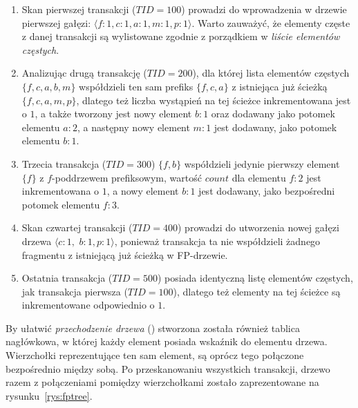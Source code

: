 \begin{enumerate}
	\item Skan pierwszej transakcji ($TID = 100$) prowadzi do wprowadzenia w drzewie pierwszej gałęzi: $\langle f: 1, c: 1, a: 1, m: 1, p: 1\rangle$. Warto zauważyć, że elementy częste z danej transakcji są wylistowane zgodnie z porządkiem w \emph{liście elementów częstych}.
	\item Analizując drugą transakcję ($TID = 200$), dla której lista elementów częstych $\lbrace f, c, a, b, m \rbrace$ współdzieli ten sam prefiks $\lbrace f, c, a \rbrace$ z istniejąca już ścieżką $\lbrace f, c, a, m, p \rbrace$, dlatego też liczba wystąpień na tej ścieżce inkrementowana jest o $1$, a także tworzony jest nowy element $b: 1$ oraz dodawany jako potomek elementu $a: 2$, a następny nowy element $m: 1$ jest dodawany, jako potomek elementu $b: 1$.
	\item Trzecia transakcja ($TID = 300$) $\lbrace f, b \rbrace$ współdzieli jedynie pierwszy element $\lbrace f \rbrace$ z $f$-poddrzewem prefiksowym, wartość $count$ dla elementu $f: 2$ jest inkrementowana o $1$, a nowy element $b: 1$ jest dodawany, jako bezpośredni potomek elementu $f: 3$.
	\item Skan czwartej transakcji ($TID = 400$) prowadzi do utworzenia nowej gałęzi drzewa $\langle c: 1,$ $b: 1, p: 1\rangle$, ponieważ transakcja ta nie współdzieli żadnego fragmentu z istniejącą już ścieżką w FP-drzewie.
	\item Ostatnia transakcja ($TID = 500$) posiada identyczną listę elementów częstych, jak transakcja pierwsza ($TID = 100$), dlatego też elementy na tej ścieżce są inkrementowane odpowiednio o $1$.
\end{enumerate}

By ułatwić \emph{przechodzenie drzewa} () stworzona została również tablica nagłówkowa, w której każdy element posiada wskaźnik do elementu drzewa. Wierzchołki reprezentujące ten sam element, są oprócz tego połączone bezpośrednio między sobą. Po przeskanowaniu wszystkich transakcji, drzewo razem z połączeniami pomiędzy wierzchołkami zostało zaprezentowane na rysunku~\ref{rys:fptree}.

